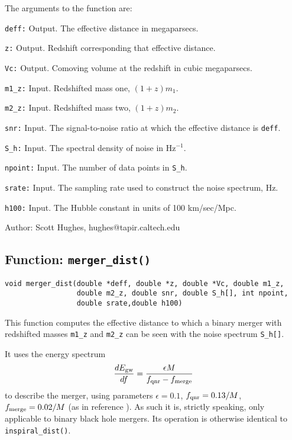 The arguments to the function are:
\begin{description}
\item{{\tt deff:}} Output.  The effective distance in megaparsecs.
\item{{\tt z:}} Output.  Redshift corresponding that effective distance.
\item{{\tt Vc:}} Output.  Comoving volume at the redshift in cubic
megaparsecs.
\item{{\tt m1\_z:}} Input.  Redshifted mass one, $(1+z)m_1$.
\item{{\tt m2\_z:}} Input.  Redshifted mass two, $(1+z)m_2$.
\item{{\tt snr:}} Input.  The signal-to-noise ratio at which the
effective distance is {\tt deff}.
\item{{\tt S\_h:}} Input.  The spectral density of noise in Hz$^{-1}$.
\item{{\tt npoint:}} Input.  The number of data points in {\tt S\_h}.
\item{{\tt srate:}} Input.  The sampling rate used to construct the
noise spectrum, Hz.
\item{{\tt h100:}} Input.  The Hubble constant in units of 100 km/sec/Mpc.
\end{description}

\begin{description}
\item{Author:} Scott Hughes, hughes@tapir.caltech.edu
\end{description}
     
\clearpage
\subsection{Function: {\tt merger\_dist()}}
\label{ss:merger_dist}
\begin{verbatim}
void merger_dist(double *deff, double *z, double *Vc, double m1_z,
                 double m2_z, double snr, double S_h[], int npoint,
                 double srate,double h100)
\end{verbatim}
\noindent
This function computes the effective distance to which a binary
merger with redshifted masses {\tt m1\_z} and {\tt m2\_z} can be
seen with the noise spectrum {\tt S\_h[]}.

It uses the energy spectrum
\begin{equation}
{dE_{\rm gw}\over df} = {\epsilon M\over f_{\rm qnr} - f_{\rm merge}}
\label{eq:mergspec}
\end{equation}
to describe the merger, using parameters $\epsilon = 0.1$, $f_{\rm
qnr} = 0.13/M$, $f_{\rm merge} = 0.02/M$ (as in reference
{\cite{flanhughes1}}).  As such it is, strictly speaking, only
applicable to binary black hole mergers.  Its operation is otherwise
identical to {\tt inspiral\_dist()}.

